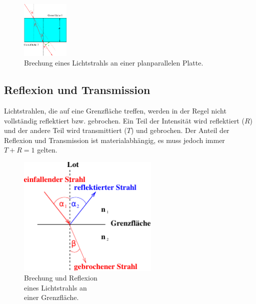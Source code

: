     \begin{figure}[H]
        \centering
        \includegraphics[width=0.2\textwidth]{build/Abb_5.pdf}
        \caption {Brechung eines Lichtstrahls an einer planparallelen Platte\cite[2]{V400}.}
        \label{fig:Abb_1}
    \end{figure}

\subsection{Reflexion und Transmission}
\label{subsec:R+T}
\begin{minipage}[t]{0,5\textwidth}
    Lichtstrahlen, die auf eine Grenzfläche treffen, werden in der Regel nicht vollständig reflektiert bzw. gebrochen.
    Ein Teil der Intensität wird reflektiert ($R$) und der andere Teil wird transmittiert ($T$) und gebrochen.
    Der Anteil der Reflexion und Transmission ist materialabhängig, es muss jedoch immer $T + R = 1$ gelten.
\end{minipage} 
\begin{minipage}[t]{0,5\textwidth}
    \begin{figure}[H]
        \centering
        \includegraphics[width=0.6\textwidth]{build/Abb_2c.pdf}
        \caption {Brechung und Reflexion\\eines Lichtstrahls an\\einer Grenzfläche\cite[2]{V400}.}
        \label{fig:Abb_1}
    \end{figure}

\end{minipage}   
